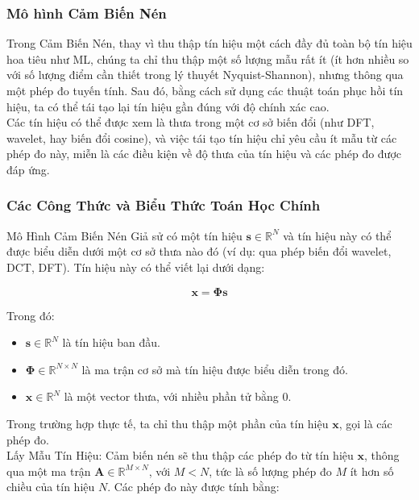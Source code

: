\documentclass{article}
\begin{document}
\newpage


\subsubsection{Mô hình Cảm Biến Nén}

 Trong Cảm Biến Nén, thay vì thu thập tín hiệu một cách đầy đủ toàn bộ tín hiệu hoa tiêu như ML, chúng ta chỉ thu thập một số lượng mẫu rất ít (ít hơn nhiều so với số lượng điểm cần thiết trong lý thuyết Nyquist-Shannon), nhưng thông qua một phép đo tuyến tính. Sau đó, bằng cách sử dụng các thuật toán phục hồi tín hiệu, ta có thể tái tạo lại tín hiệu gần đúng với độ chính xác cao.\\

 Các tín hiệu có thể được xem là thưa trong một cơ sở biến đổi (như DFT, wavelet, hay biến đổi cosine), và việc tái tạo tín hiệu chỉ yêu cầu ít mẫu từ các phép đo này, miễn là các điều kiện về độ thưa của tín hiệu và các phép đo được đáp ứng.\\

\subsubsection{Các Công Thức và Biểu Thức Toán Học Chính}

 Mô Hình Cảm Biến Nén
Giả sử có một tín hiệu \( \mathbf{s} \in \mathbb{R}^N \) và tín hiệu này có thể được biểu diễn dưới một cơ sở thưa nào đó (ví dụ: qua phép biến đổi wavelet, DCT, DFT). Tín hiệu này có thể viết lại dưới dạng:

\[
\mathbf{x} = \mathbf{\Phi} \mathbf{s}
\]

Trong đó:
\begin{itemize}
  \item \( \mathbf{s} \in \mathbb{R}^N \) là tín hiệu ban đầu.
  \item \( \mathbf{\Phi} \in \mathbb{R}^{N \times N} \) là ma trận cơ sở mà tín hiệu được biểu diễn trong đó.
  \item \(  \mathbf{x} \in \mathbb{R}^N \) là một vector thưa, với nhiều phần tử bằng 0.
\end{itemize}

Trong trường hợp thực tế, ta chỉ thu thập một phần của tín hiệu \( \mathbf{x} \), gọi là các phép đo.\\

 Lấy Mẫu Tín Hiệu:
Cảm biến nén sẽ thu thập các phép đo từ tín hiệu \( \mathbf{x} \), thông qua một ma trận \( \mathbf{A} \in \mathbb{R}^{M \times N} \), với \( M < N \), tức là số lượng phép đo \( M \) ít hơn số chiều của tín hiệu \( N \). Các phép đo này được tính bằng:
\end{document}
